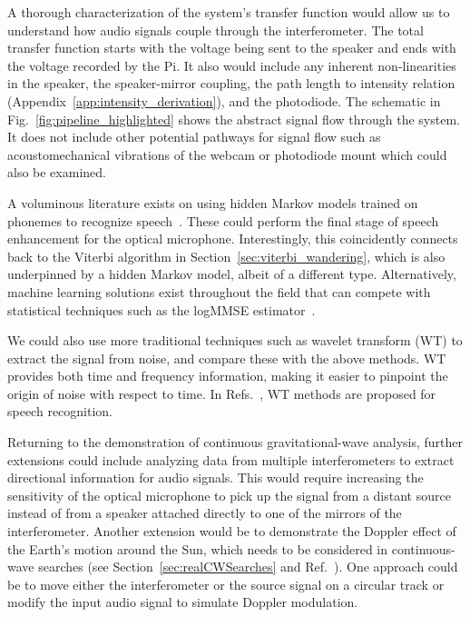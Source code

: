 \documentclass[paper-main.tex]{subfiles}
\begin{document}
A thorough characterization of the system's transfer function would allow us to understand how audio signals couple through the interferometer. 
The total transfer function starts with the voltage being sent to the speaker and ends with the voltage recorded by the Pi. It also would include any inherent non-linearities in the speaker, the speaker-mirror coupling, the path length to intensity relation (Appendix~\ref{app:intensity_derivation}), and the photodiode. The schematic in Fig.~\ref{fig:pipeline_highlighted} shows the abstract signal flow through the system.
It does not include other potential pathways for signal flow such as acoustomechanical vibrations of the webcam or photodiode mount which could also be examined.

A voluminous literature exists on using hidden Markov models trained on phonemes to recognize speech~\cite{HMM_english}. These could perform the final stage of speech enhancement for the optical microphone. Interestingly, this coincidently connects back to the Viterbi algorithm in Section~\ref{sec:viterbi_wandering}, which is also underpinned by a hidden Markov model, albeit of a different type. Alternatively, machine learning solutions exist throughout the field that can compete with statistical techniques such as the logMMSE estimator~\cite{SEGAN}.


We could also use more traditional techniques such as wavelet transform (WT) \citep{nason1995stationary} to extract the signal from noise, and compare these with the above methods. WT provides both time and frequency information, making it easier to pinpoint the origin of noise with respect to time. In Refs.~\cite{tufekci2000feature,agbinya1996discrete}, WT methods are proposed for speech recognition. 

Returning to the demonstration of continuous gravitational-wave analysis, further extensions could include analyzing data from multiple interferometers to extract directional information for audio signals. 
This would require increasing the sensitivity of the optical microphone to pick up the signal from a distant source instead of from a speaker attached directly to one of the mirrors of the interferometer.
Another extension would be to demonstrate the Doppler effect of the Earth's motion around the Sun, which needs to be considered in continuous-wave searches (see Section~\ref{sec:realCWSearches} and Ref.~\cite{JKS:1998}). 
One approach could be to move either the interferometer or the source signal on a circular track or modify the input audio signal to simulate Doppler modulation. 
\end{document}
